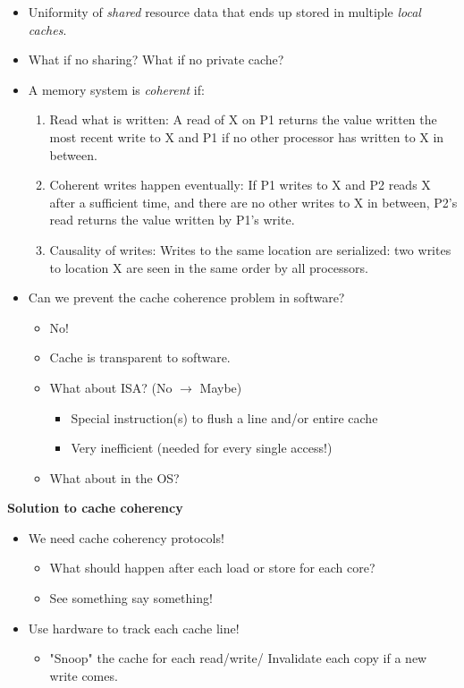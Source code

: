 \documentclass[10pt]{article}
\begin{document}
\begin{itemize}
    \item Uniformity of \textit{shared} resource data that ends up stored in multiple \textit{local caches}.
    \item What if no sharing?  What if no private cache?
    \item A memory system is \textit{coherent} if:
    \begin{enumerate}
        \item Read what is written: A read of X on P1 returns the value written the most recent write to X and P1 if no other processor has written to X in between.
        \item Coherent writes happen eventually: If P1 writes to X and P2 reads X after a sufficient time, and there are no other writes to X in between, P2's read returns the value written by P1's write.
        \item Causality of writes: Writes to the same location are serialized: two writes to location X are seen in the same order by all processors.
    \end{enumerate}
    \item Can we prevent the cache coherence problem in software?
    \begin{itemize}
        \item No!
        \item Cache is transparent to software.
        \item What about ISA?  (No $\rightarrow$ Maybe)
        \begin{itemize}
            \item Special instruction(s) to flush a line and/or entire cache
            \item Very inefficient (needed for every single access!)
        \end{itemize}
        \item What about in the OS?
    \end{itemize}
\end{itemize}
\textbf{Solution to cache coherency}
\begin{itemize}
    \item We need cache coherency protocols!
    \begin{itemize}
        \item What should happen after each load or store for each core?
        \item See something say something!
    \end{itemize}
    \item Use hardware to track each cache line!
    \begin{itemize}
        \item "Snoop" the cache for each read/write/  Invalidate each copy if a new write comes.
    \end{itemize}
\end{itemize}
\end{document}
